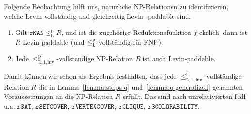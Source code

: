 Folgende Beobachtung hilft uns, natürliche NP-Relationen zu identifizieren, welche Levin-vollständig und gleichzeitig Levin -paddable sind.
\begin{observation}\label{obs:invcomplete-sind-levinpaddable}
    \begin{enumerate}
        \item Gilt $\mathtt{rKAN}\leq_\mathrm{L}^\mathrm{p} R$, und ist die zugehörige Reduktionsfunktion $f$ ehrlich, dann ist $R$ Levin-paddable (und $\leq_\mathrm{L}^\mathrm{p}$-vollständig für $\mathrm{FNP}$).
        \item Jede $\leq_\mathrm{L,1,inv}^\mathrm{p}$-vollständige NP-Relation $R$ ist auch Levin-paddable.
    \end{enumerate}
\end{observation}
Damit können wir schon als Ergebnis festhalten, dass 
jede $\leq_\mathrm{L,1,inv}^\mathrm{p}$-vollständige Relation $R$ die in 
Lemma~\ref{lemma:stdps-q} und~\ref{lemma:q-generalized} genannten Voraussetzungen an die NP-Relation $R$ erfüllt.
Das sind nach \textcite{goldreich_computational_2008} unrelativierten Fall u.a. $\mathtt{rSAT}$, $\mathtt{rSETCOVER}$, $\mathtt{rVERTEXCOVER}$, $\mathtt{rCLIQUE}$, $\mathtt{r3COLORABILITY}$.

